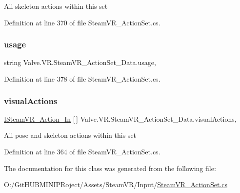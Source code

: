 All skeleton actions within this set 



Definition at line 370 of file Steam\+V\+R\+\_\+\+Action\+Set.\+cs.

\mbox{\label{class_valve_1_1_v_r_1_1_steam_v_r___action_set___data_a6baa50a7aac716829461d1513667bbdf}} 
\subsubsection{\texorpdfstring{usage}{usage}}
{\footnotesize\ttfamily string Valve.\+V\+R.\+Steam\+V\+R\+\_\+\+Action\+Set\+\_\+\+Data.\+usage\hspace{0.3cm}{\ttfamily [get]}, {\ttfamily [set]}}



Definition at line 378 of file Steam\+V\+R\+\_\+\+Action\+Set.\+cs.

\mbox{\label{class_valve_1_1_v_r_1_1_steam_v_r___action_set___data_a16fdd46dfe641ebedacfb06d46cc1749}} 
\subsubsection{\texorpdfstring{visualActions}{visualActions}}
{\footnotesize\ttfamily \mbox{\hyperlink{interface_valve_1_1_v_r_1_1_i_steam_v_r___action___in}{I\+Steam\+V\+R\+\_\+\+Action\+\_\+\+In}} \mbox{[}$\,$\mbox{]} Valve.\+V\+R.\+Steam\+V\+R\+\_\+\+Action\+Set\+\_\+\+Data.\+visual\+Actions\hspace{0.3cm}{\ttfamily [get]}, {\ttfamily [set]}}



All pose and skeleton actions within this set 



Definition at line 364 of file Steam\+V\+R\+\_\+\+Action\+Set.\+cs.



The documentation for this class was generated from the following file\+:\begin{DoxyCompactItemize}
\item 
O\+:/\+Git\+H\+U\+B\+M\+I\+N\+I\+P\+Roject/\+Assets/\+Steam\+V\+R/\+Input/\mbox{\hyperlink{_steam_v_r___action_set_8cs}{Steam\+V\+R\+\_\+\+Action\+Set.\+cs}}\end{DoxyCompactItemize}
